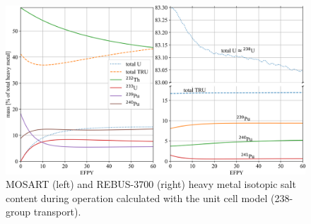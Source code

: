\documentclass[letterpaper]{mandc2019}
\begin{document}
\begin{figure}[!htb]
  \centering
  \includegraphics[width=\textwidth]{./Figures/mosart_rebus_balance.png}
  	  \vspace{-0.2in}
  \caption{\gls{MOSART} (left) and REBUS-3700 (right) heavy metal isotopic salt content during operation calculated with the unit cell model (238-group transport).}
  \label{fig:mosart-balance}
    \vspace{-0.3in}
\end{figure}
\end{document}
